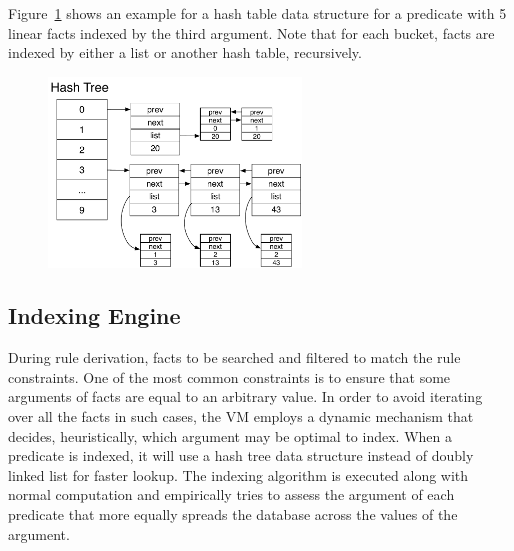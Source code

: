 Figure~\ref{fig:implementation:hash_table} shows an example for a hash table
data structure for a  predicate with 5 linear facts
indexed by the third argument. Note that for each bucket, facts are indexed by
either a list or another hash table, recursively.

\begin{figure}[ht]
   \centering
   \includegraphics[width=0.6\textwidth]{figures/implementation/hash_table.pdf}


   \label{fig:implementation:hash_table}
\end{figure}


\subsection{Indexing Engine}\label{sec:implementation:indexing}

During rule derivation, facts to be searched and filtered to match the rule
constraints. One of the most common constraints is to ensure that some arguments
of facts are equal to an arbitrary value. In order to avoid iterating over all
the facts in such cases, the VM employs a dynamic mechanism that decides,
heuristically, which argument may be optimal to index. When a predicate is
indexed, it will use a hash tree data structure instead of doubly linked list for
faster lookup. The indexing algorithm is executed along with normal computation
and empirically tries to assess the argument of each predicate that more equally
spreads the database across the values of the argument. 

